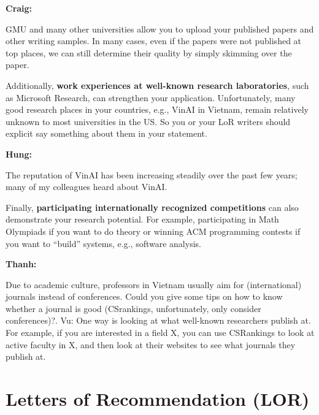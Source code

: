 \documentclass[oneside,11pt]{memoir}
\newenvironment{commentbox}[1][]{
  \small
  \begin{mybox}
    {\small \textbf{#1}}
  }{
  \end{mybox}
}
\begin{document}



\begin{commentbox}[Craig:]
  GMU and many other universities allow you to upload your published papers and other writing samples. In many cases, even if the papers were not published at top places, we can still determine their quality by simply skimming over the paper.
\end{commentbox}

Additionally, \textbf{work experiences at well-known research laboratories}, such as Microsoft Research, can strengthen your
application.  Unfortunately, many good research places in your countries, e.g., VinAI in Vietnam, remain relatively unknown to most universities in the US. So you or your LoR writers should explicit say something about them in your statement.



\begin{commentbox}[Hung:]
  The reputation of VinAI has been increasing steadily over the past few years; many of my colleagues heard about VinAI.
\end{commentbox}

Finally, \textbf{participating internationally recognized competitions} can also demonstrate your research potential.
For example, participating in Math Olympiads if you want to do theory or  winning ACM programming contests if you want to ``build'' systems, e.g., software analysis.

\begin{commentbox}[Thanh:]
  Due to academic culture, professors in Vietnam usually aim for (international) journals instead of conferences. Could you give some tips on how to know whether a journal is good (CSrankings, unfortunately, only consider conferences)?.
  \tcblower
  Vu: One way is looking at what well-known researchers publish at. For example, if you are interested in a field X, you can use CSRankings to look at active faculty in X, and then look at their websites to see what journals they publish at.
\end{commentbox}

\section{Letters of Recommendation (LOR)}\label{sec:lor}
\end{document}
